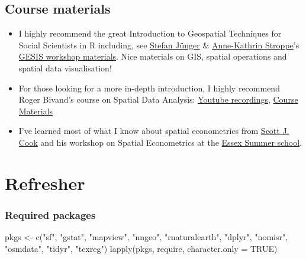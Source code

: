 \documentclass[
  letterpaper,
  DIV=11,
  numbers=noendperiod]{scrreprt}
\newenvironment{Shaded}{\begin{snugshade}}{\end{snugshade}}
\newcommand{\AttributeTok}[1]{\textcolor[rgb]{0.40,0.45,0.13}{#1}}
\newcommand{\ConstantTok}[1]{\textcolor[rgb]{0.56,0.35,0.01}{#1}}
\newcommand{\FunctionTok}[1]{\textcolor[rgb]{0.28,0.35,0.67}{#1}}
\newcommand{\NormalTok}[1]{\textcolor[rgb]{0.00,0.23,0.31}{#1}}
\newcommand{\OtherTok}[1]{\textcolor[rgb]{0.00,0.23,0.31}{#1}}
\newcommand{\StringTok}[1]{\textcolor[rgb]{0.13,0.47,0.30}{#1}}
\begin{document}
\hypertarget{course-materials}{%
\section*{Course materials}\label{course-materials}}


\begin{itemize}
\item
  I highly recommend the great Introduction to Geospatial Techniques for
  Social Scientists in R including, see
  \href{https://stefanjuenger.github.io/}{Stefan Jünger} \&
  \href{https://www.gesis.org/institut/mitarbeitendenverzeichnis/person/Anne-Kathrin.Stroppe}{Anne-Kathrin
  Stroppe}'s
  \href{https://github.com/StefanJuenger/gesis-workshop-geospatial-techniques-R-2023}{GESIS
  workshop materials}. Nice materials on GIS, spatial operations and
  spatial data visualisation!
\item
  For those looking for a more in-depth introduction, I highly recommend
  Roger Bivand's course on Spatial Data Analysis:
  \href{https://www.youtube.com/watch?v=KkIbg50Pa0I\&list=PLXUoTpMa_9s10NVk4dBQljNOaOXAOhcE0}{Youtube
  recordings}, \href{https://rsbivand.github.io/ECS530_h19/}{Course
  Materials}
\item
  I've learned most of what I know about spatial econometrics from
  \href{http://www.scottjcook.net/}{Scott J. Cook} and his workshop on
  Spatial Econometrics at the
  \href{https://essexsummerschool.com/summer-school-facts/courses/ess-2023-course-list/}{Essex
  Summer school}.
\end{itemize}


\hypertarget{refresher}{%
\chapter{Refresher}\label{refresher}}

\hypertarget{required-packages}{%
\subsection*{Required packages}\label{required-packages}}

\begin{Shaded}
\begin{Highlighting}[]
\NormalTok{pkgs }\OtherTok{\textless{}{-}} \FunctionTok{c}\NormalTok{(}\StringTok{"sf"}\NormalTok{, }\StringTok{"gstat"}\NormalTok{, }\StringTok{"mapview"}\NormalTok{, }\StringTok{"nngeo"}\NormalTok{, }\StringTok{"rnaturalearth"}\NormalTok{, }\StringTok{"dplyr"}\NormalTok{,}
          \StringTok{"nomisr"}\NormalTok{, }\StringTok{"osmdata"}\NormalTok{, }\StringTok{"tidyr"}\NormalTok{, }\StringTok{"texreg"}\NormalTok{) }
\FunctionTok{lapply}\NormalTok{(pkgs, require, }\AttributeTok{character.only =} \ConstantTok{TRUE}\NormalTok{)}
\end{Highlighting}
\end{Shaded}
\end{document}
